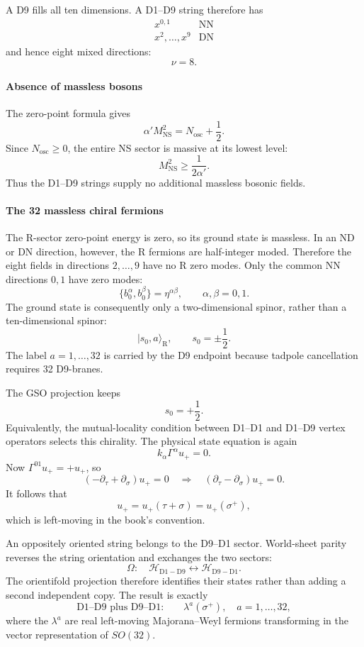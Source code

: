 \documentclass[
  10pt,
  a4paper,
  openany]{book}
\begin{document}
A D9 fills all ten dimensions. A D1--D9 string therefore has \[
\begin{array}{c|c}
x^{0,1}&\mathrm{NN}\\
x^{2},\ldots,x^9&\mathrm{DN}
\end{array}
\] and hence eight mixed directions: \[
\nu=8.
\]

\paragraph{Absence of massless bosons}\label{absence-of-massless-bosons}

The zero-point formula gives \[
\alpha'M_{\mathrm{NS}}^2
=N_{\mathrm{osc}}+\frac12.
\] Since \(N_{\mathrm{osc}}\geq0\), the entire NS sector is massive at
its lowest level: \[
M_{\mathrm{NS}}^2
\geq\frac1{2\alpha'}.
\] Thus the D1--D9 strings supply no additional massless bosonic fields.

\paragraph{The 32 massless chiral
fermions}\label{the-32-massless-chiral-fermions}

The R-sector zero-point energy is zero, so its ground state is massless.
In an ND or DN direction, however, the R fermions are half-integer
moded. Therefore the eight fields in directions \(2,\ldots,9\) have no R
zero modes. Only the common NN directions \(0,1\) have zero modes: \[
\{b_0^\alpha,b_0^\beta\}
=\eta^{\alpha\beta},
\qquad
\alpha,\beta=0,1.
\] The ground state is consequently only a two-dimensional spinor,
rather than a ten-dimensional spinor: \[
|s_0,a\rangle_{\mathrm R},
\qquad
s_0=\pm\frac12.
\] The label \(a=1,\ldots,32\) is carried by the D9 endpoint because
tadpole cancellation requires 32 D9-branes.

The GSO projection keeps \[
s_0=+\frac12.
\] Equivalently, the mutual-locality condition between D1--D1 and D1--D9
vertex operators selects this chirality. The physical state equation is
again \[
k_\alpha\Gamma^\alpha u_+=0.
\] Now \(\Gamma^{01}u_+=+u_+\), so \[
\left(
-\partial_\tau+\partial_\sigma
\right)u_+=0
\quad\Longrightarrow\quad
\left(\partial_\tau-\partial_\sigma\right)u_+=0.
\] It follows that \[
u_+=u_+(\tau+\sigma)=u_+(\sigma^+),
\] which is left-moving in the book's convention.

An oppositely oriented string belongs to the D9--D1 sector. World-sheet
parity reverses the string orientation and exchanges the two sectors: \[
\Omega:
\quad
\mathcal H_{\mathrm{D1-D9}}
\longleftrightarrow
\mathcal H_{\mathrm{D9-D1}}.
\] The orientifold projection therefore identifies their states rather
than adding a second independent copy. The result is exactly \[
\boxed{
\text{D1--D9 plus D9--D1:}\qquad
\lambda^a(\sigma^+),
\quad a=1,\ldots,32
},
\] where the \(\lambda^a\) are real left-moving Majorana--Weyl fermions
transforming in the vector representation of \(SO(32)\).
\end{document}
